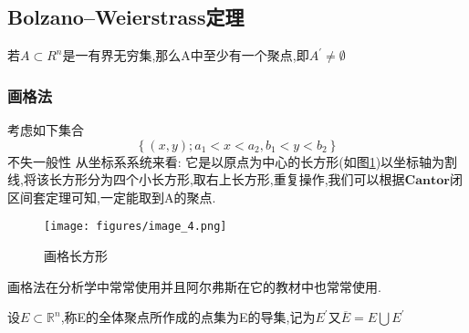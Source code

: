 \subsection{Bolzano–Weierstrass定理}
若\(A \subset R^{n}\)是一有界无穷集,那么A中至少有一个聚点,即\(A^{'} \neq \emptyset\)
\subsubsection*{画格法}
考虑如下集合\[\left\{(x,y) ; a_1 < x <a_2 , b_1<y<b_2 \right\}\]不失一般性
从坐标系系统来看: 它是以原点为中心的长方形(如图\ref{画格长方形})以坐标轴为割线,将该长方形分为四个小长方形,取右上长方形,重复操作,我们可以根据\(\textbf{Cantor}\)闭区间套定理可知,一定能取到A的聚点.
\begin{figure}[h]
    \centering
    \texttt{[image: figures/image\_4.png]}
    \caption{画格长方形}
    \label{画格长方形}
\end{figure}
\begin{note}
    画格法在分析学中常常使用并且阿尔弗斯在它的教材中也常常使用.
\end{note}
\begin{Definition}
    设\(E \subset \mathbb{R}^{n} \),称E的全体聚点所作成的点集为E的导集,记为\(E^{'}\)又\(\overline{E}=E \bigcup E^{'}\) 
\end{Definition}

